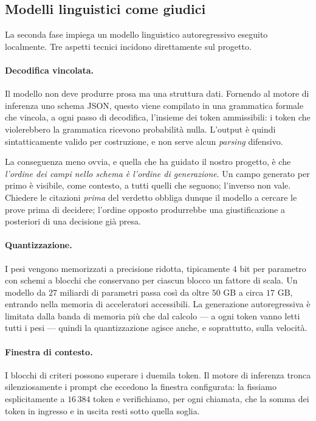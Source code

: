 \documentclass[pdflatex,sn-mathphys-num]{sn-jnl}
\theoremstyle{thmstyleone}
\theoremstyle{thmstyletwo}
\theoremstyle{thmstylethree}
\begin{document}
\subsection{Modelli linguistici come giudici}\label{sec:llm}

La seconda fase impiega un modello linguistico autoregressivo eseguito localmente. Tre aspetti tecnici incidono direttamente sul progetto.

\paragraph{Decodifica vincolata.} Il modello non deve produrre prosa ma una struttura dati. Fornendo al motore di inferenza uno schema JSON, questo viene compilato in una grammatica formale che vincola, a ogni passo di decodifica, l'insieme dei token ammissibili: i token che violerebbero la grammatica ricevono probabilità nulla. L'output è quindi sintatticamente valido per costruzione, e non serve alcun \emph{parsing} difensivo.

La conseguenza meno ovvia, e quella che ha guidato il nostro progetto, è che \emph{l'ordine dei campi nello schema è l'ordine di generazione}. Un campo generato per primo è visibile, come contesto, a tutti quelli che seguono; l'inverso non vale. Chiedere le citazioni \emph{prima} del verdetto obbliga dunque il modello a cercare le prove prima di decidere; l'ordine opposto produrrebbe una giustificazione a posteriori di una decisione già presa.

\paragraph{Quantizzazione.} I pesi vengono memorizzati a precisione ridotta, tipicamente $4$ bit per parametro con schemi a blocchi che conservano per ciascun blocco un fattore di scala. Un modello da $27$ miliardi di parametri passa così da oltre $50$ GB a circa $17$ GB, entrando nella memoria di acceleratori accessibili. La generazione autoregressiva è limitata dalla banda di memoria più che dal calcolo --- a ogni token vanno letti tutti i pesi --- quindi la quantizzazione agisce anche, e soprattutto, sulla velocità.

\paragraph{Finestra di contesto.} I blocchi di criteri possono superare i duemila token. Il motore di inferenza tronca silenziosamente i prompt che eccedono la finestra configurata: la fissiamo esplicitamente a $16\,384$ token e verifichiamo, per ogni chiamata, che la somma dei token in ingresso e in uscita resti sotto quella soglia.
\end{document}
